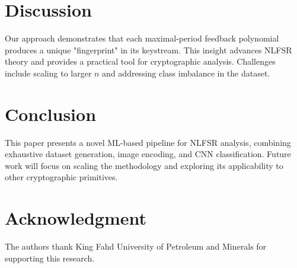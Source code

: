 \documentclass[conference]{IEEEtran}
\begin{document}
\section{Discussion}
Our approach demonstrates that each maximal-period feedback polynomial produces a unique "fingerprint" in its keystream. This insight advances NLFSR theory and provides a practical tool for cryptographic analysis. Challenges include scaling to larger $n$ and addressing class imbalance in the dataset.

\section{Conclusion}
This paper presents a novel ML-based pipeline for NLFSR analysis, combining exhaustive dataset generation, image encoding, and CNN classification. Future work will focus on scaling the methodology and exploring its applicability to other cryptographic primitives.

\section*{Acknowledgment}
The authors thank King Fahd University of Petroleum and Minerals for supporting this research.



\end{document}
